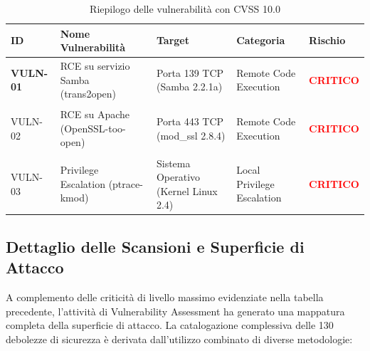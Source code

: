 \documentclass[12pt, a4paper]{article}
\begin{document}
	\begin{table}[H]
    \renewcommand{\arraystretch}{1.5}
    \begin{tabularx}{\textwidth}{@{} >{\bfseries}l >{\raggedright\arraybackslash}X >{\raggedright\arraybackslash}X >{\raggedright\arraybackslash}X l @{}}
        \toprule
        \textbf{ID} & \textbf{Nome Vulnerabilità} & \textbf{Target} & \textbf{Categoria} & \textbf{Rischio} \\
        
        \midrule
        VULN-01 & RCE su servizio Samba (trans2open) & Porta 139 TCP (Samba 2.2.1a) & Remote Code Execution & \textcolor{red}{\textbf{CRITICO}} \\
        \addlinespace
        
        VULN-02 & RCE su Apache (OpenSSL-too-open) & Porta 443 TCP (mod\_ssl 2.8.4) & Remote Code Execution & \textcolor{red}{\textbf{CRITICO}} \\
        \addlinespace
        
        VULN-03 & Privilege Escalation (ptrace-kmod) & Sistema Operativo (Kernel Linux 2.4) & Local Privilege Escalation & \textcolor{red}{\textbf{CRITICO}} \\
        
        \bottomrule
    \end{tabularx}
    \caption{Riepilogo delle vulnerabilità con CVSS 10.0}
    \label{tab:findings_summary}
\end{table}

	\newpage
	\subsection{Dettaglio delle Scansioni e Superficie di Attacco}

	A complemento delle criticità di livello massimo evidenziate nella tabella precedente, l'attività di Vulnerability Assessment ha generato una mappatura completa della superficie di attacco. La catalogazione complessiva delle 130 debolezze di sicurezza è derivata dall'utilizzo combinato di diverse metodologie:
\end{document}
